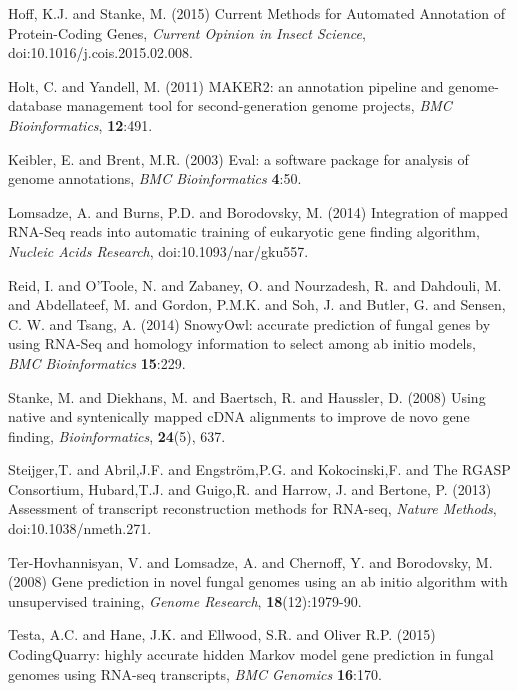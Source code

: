 \documentclass{bioinfo}
\begin{document}
\begin{thebibliography}{}
Hoff, K.J. and Stanke, M. (2015) Current Methods for Automated Annotation of Protein-Coding Genes, {\it Current Opinion in Insect Science}, doi:10.1016/j.cois.2015.02.008.

 Holt, C. and Yandell, M. (2011) MAKER2: an annotation pipeline and genome-database management tool for second-generation genome projects, \textit{BMC Bioinformatics}, \textbf{12}:491.

 Keibler, E. and Brent, M.R. (2003) Eval: a software package for analysis of genome annotations, \textit{BMC Bioinformatics} \textbf{4}:50.

 Lomsadze, A. and Burns, P.D. and Borodovsky, M. (2014) Integration of mapped RNA-Seq reads into automatic training of eukaryotic gene finding algorithm, {\it Nucleic Acids Research}, doi:10.1093/nar/gku557.

Reid, I. and O'Toole, N. and Zabaney, O. and Nourzadesh, R. and Dahdouli, M. and Abdellateef, M. and Gordon, P.M.K. and Soh, J. and Butler, G. and Sensen, C. W. and Tsang, A. (2014) SnowyOwl: accurate prediction of fungal genes by using RNA-Seq and homology information to select among ab initio models, \textit{BMC Bioinformatics} \textbf{15}:229.

Stanke, M. and Diekhans, M. and Baertsch, R. and Haussler, D. (2008) Using native and syntenically mapped cDNA alignments to improve de novo gene finding, \textit{Bioinformatics}, \textbf{24}(5), 637.

 Steijger,T. and Abril,J.F. and Engstr\"{o}m,P.G. and Kokocinski,F. and The RGASP Consortium, Hubard,T.J. and Guigo,R. and Harrow, J. and Bertone, P. (2013) Assessment of transcript reconstruction methods for
 RNA-seq, {\it Nature Methods}, doi:10.1038/nmeth.271.


 Ter-Hovhannisyan, V. and Lomsadze, A. and Chernoff, Y. and Borodovsky, M. (2008) Gene prediction in novel fungal genomes using an ab initio algorithm with unsupervised training, \textit{Genome Research}, \textbf{18}(12):1979-90.

 Testa, A.C. and Hane, J.K. and Ellwood, S.R. and Oliver R.P. (2015) CodingQuarry: highly accurate hidden Markov model gene prediction in fungal genomes using RNA-seq transcripts, \textit{BMC Genomics} \textbf{16}:170.


\end{thebibliography}
\end{document}
